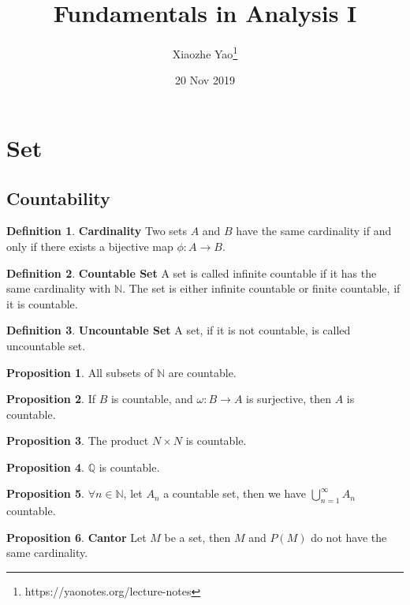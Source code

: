 \documentclass{article}
\title{Fundamentals in Analysis I}
\author{Xiaozhe Yao\footnote{https://yaonotes.org/lecture-notes}}
\date{20 Nov 2019}
\theoremstyle{definition}
\newtheorem{defi}{Definition}[subsection]
\newtheorem{prop}{Proposition}[subsection]
\begin{document}
\maketitle

\section{Set}

\subsection{Countability}

\begin{defi}
\textbf{Cardinality} Two sets $A$ and $B$ have the same cardinality if and only if there exists a bijective map $\phi: A\to B$.
\end{defi}

\begin{defi}
\textbf{Countable Set} A set is called infinite countable if it has the same cardinality with $\mathbb{N}$. The set is either infinite countable or finite countable, if it is countable.
\end{defi}

\begin{defi}
\textbf{Uncountable Set} A set, if it is not countable, is called uncountable set.
\end{defi}

\begin{prop}
All subsets of $\mathbb{N}$ are countable.
\end{prop}

\begin{prop}
If $B$ is countable, and $\omega: B\to A$ is surjective, then $A$ is countable.
\end{prop}

\begin{prop}
The product $N \times N$ is countable.
\end{prop}

\begin{prop}
$\mathbb{Q}$ is countable.
\end{prop}

\begin{prop}
$\forall n\in \mathbb{N}$, let $A_n$ a countable set, then we have $\bigcup_{n=1}^{\infty}A_{n}$ countable.
\end{prop}

\begin{prop}
\textbf{Cantor} Let $M$ be a set, then $M$ and $P(M)$ do not have the same cardinality.
\end{prop}
\end{document}
